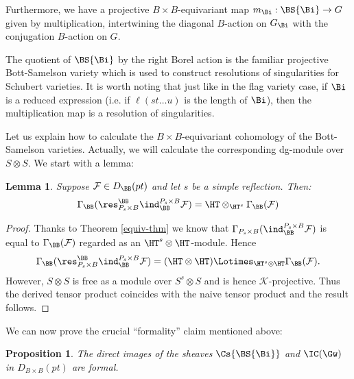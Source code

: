 \documentclass[12pt]{wart}
\newtheorem{lem}[thm]{Lemma}
\newtheorem{prop}[thm]{Proposition}
\theoremstyle{remark}
\begin{document}
Furthermore, we have a projective $B\times
B$-equivariant map $m_\Bi:\BS{\Bi}\to G$ given by multiplication, intertwining the diagonal $B$-action on $G_\Bi$ with the conjugation $B$-action on $G$.  

The quotient of $\BS{\Bi}$ by the right Borel action is the familiar
projective Bott-Samelson variety which is used to construct
resolutions of singularities for Schubert varieties.  It is worth
noting that just like in the flag variety case, if $\Bi$ is a reduced
expression (i.e. if $\ell(st\dots u)$ is the length of $\Bi$), then the multiplication map is a resolution of singularities.

Let us explain how to calculate the $B \times B$-equivariant
cohomology of the Bott-Samelson varieties. Actually, we will calculate
the corresponding dg-module over $S \otimes S$. We start with a lemma:

\begin{lem} Suppose $\mathcal{F} \in D_{\BB}(pt)$ and let $s$ be a simple reflection. Then:
\begin{displaymath}
  \Gamma_{\BB}( \res_{P_s \times B}^{\BB} \ind_{\BB}^{P_s \times B} \mathcal{F}) = \HT\otimes_{\HT^s} \Gamma_{\BB}(\mathcal{F})
\end{displaymath}
\end{lem}

\begin{proof} Thanks to Theorem \ref{equiv-thm} we know that
  $\Gamma_{P_s \times B} (\ind_{\BB}^{P_s \times B} \mathcal{F})$ is
  equal to $\Gamma_{\BB}(\mathcal{F})$ regarded as an $\HT^s \otimes
  \HT$-module. Hence 
  \begin{equation*}
    \Gamma_{\BB}( \res_{P_s \times B}^{\BB}
  \ind_{\BB}^{P_s \times B} \mathcal{F}) = (\HT \otimes \HT)
  \Lotimes_{\HT^s \otimes \HT} \Gamma_{\BB}(\mathcal{F}).
    \end{equation*}
    However, $S \otimes S$ is free as a module over $S^s\otimes S$ and
    is hence $\mathcal{K}$-projective. Thus the derived tensor product
    coincides with the naive tensor product and the result follows.
\end{proof}

 
We can now prove the crucial ``formality'' claim mentioned above:

\begin{prop} 
  The direct images of the sheaves $\Cs{\BS{\Bi}}$ and $\IC(\Gw)$ in $D_{B \times
    B}(pt)$ are formal.
\end{prop}
\end{document}
